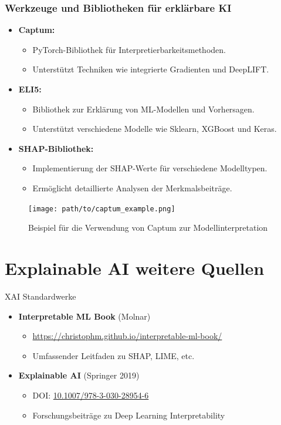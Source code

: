 \documentclass[aspectratio=1610, xcolor=dvipsnames, 9pt]{beamer}
\begin{document}
\begin{frame}
  \frametitle{Werkzeuge und Bibliotheken für erklärbare KI}
  \begin{itemize}
      \item \textbf{Captum:}
      \begin{itemize}
          \item PyTorch-Bibliothek für Interpretierbarkeitsmethoden.
          \item Unterstützt Techniken wie integrierte Gradienten und DeepLIFT.
      \end{itemize}
      \item \textbf{ELI5:}
      \begin{itemize}
          \item Bibliothek zur Erklärung von ML-Modellen und Vorhersagen.
          \item Unterstützt verschiedene Modelle wie Sklearn, XGBoost und Keras.
      \end{itemize}
      \item \textbf{SHAP-Bibliothek:}
      \begin{itemize}
          \item Implementierung der SHAP-Werte für verschiedene Modelltypen.
          \item Ermöglicht detaillierte Analysen der Merkmalsbeiträge.
      \end{itemize}
  \end{itemize}
  \begin{figure}
      \centering
      \texttt{[image: path/to/captum\_example.png]}
      \caption{Beispiel für die Verwendung von Captum zur Modellinterpretation}
  \end{figure}
\end{frame}

\section{Explainable AI weitere Quellen}

\begin{frame}{XAI Standardwerke}
  \begin{itemize}
    \item \textbf{Interpretable ML Book} (Molnar)
    \begin{itemize}
      \item \url{https://christophm.github.io/interpretable-ml-book/}
      \item Umfassender Leitfaden zu SHAP, LIME, etc.
    \end{itemize}
    \item \textbf{Explainable AI} (Springer 2019)
    \begin{itemize}
      \item DOI: \href{https://doi.org/10.1007/978-3-030-28954-6}{10.1007/978-3-030-28954-6}
      \item Forschungsbeiträge zu Deep Learning Interpretability
    \end{itemize}
  \end{itemize}
\end{frame}
\end{document}
